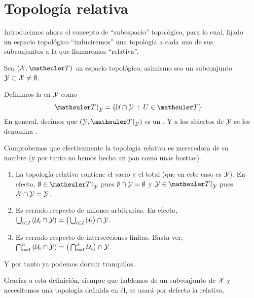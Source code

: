 \section{Topología relativa}
Introducimos ahora el concepto de ``subespacio'' topológico, para lo cual, fijado un espacio topológico ``induciremos'' una topología a cada uno de sus subconjuntos a la que llamaremos ``relativa''.
\begin{defi}
	Sea $(\X,\T)$ un espacio topológico, asimismo sea un subconjunto $\mathcal{Y}\subset\mathcal{X} \neq \emptyset$.
	
	Definimos la  en $\mathcal{Y}$ como \begin{equation}
		\T\restriction_\mc{Y} = \{\U\cap\mc{Y}\midc U\in\T\}
	\end{equation}
	En general, decimos que $(\mc{Y},\T\restriction_\mc{Y})$ es un . Y a los abiertos de $\mathcal{Y}$ se les denomina .
\end{defi}
\begin{obs}
	Comprobemos que efectivamente la topología relativa es merecedora de su nombre (y por tanto no hemos hecho un pan como unas hostias).
	\begin{enumerate}
		\item La topología relativa contiene el vacío y el total (que en este caso es $\mathcal{Y}$). En efecto, $\emptyset \in \T\restriction_\mc{Y}$ pues $\emptyset \cap \mathcal{Y} = \emptyset$ y $\mc{Y} \in \T\restriction_\mc{Y}$ pues $\mathcal{X} \cap \mathcal{Y} = \mathcal{Y}$.
		\item Es cerrado respecto de uniones arbitrarias. En efecto, $\bigcup_{i \in I}{(\mathcal{U}_i \cap \mathcal{Y})} = \big( \bigcup_{i \in I} \mathcal{U}_i \big) \cap \mathcal{Y}$.
		\item Es cerrado respecto de intersecciones finitas. Basta ver, $\bigcap_{i = 1}^{n}{(\mathcal{U}_i \cap \mathcal{Y})} = \big( \bigcap_{i=1}^{n} \mathcal{U}_i \big) \cap \mathcal{Y}$.
	\end{enumerate}
	Y por tanto ya podemos dormir tranquilos.
\end{obs}

Gracias a esta definición, siempre que hablemos de un subconjunto de $\mathcal{X}$ y necesitemos una topología definida en él, se usará por defecto la relativa.

